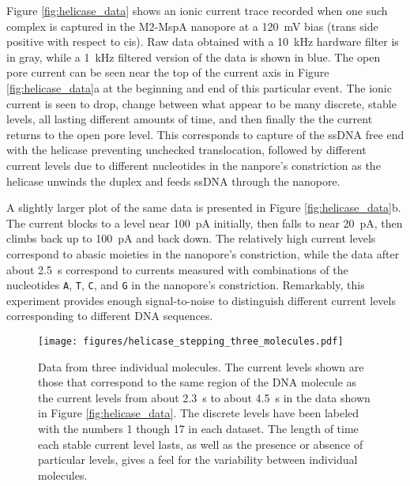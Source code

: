 Figure \ref{fig:helicase_data} shows an ionic current trace recorded when one such complex is captured in the M2-MspA nanopore at a \SI{120}{\mV} bias (trans side positive with respect to cis).  Raw data obtained with a \SI{10}{\kHz} hardware filter is in gray, while a \SI{1}{\kHz} filtered version of the data is shown in blue.  The open pore current can be seen near the top of the current axis in Figure \ref{fig:helicase_data}a at the beginning and end of this particular event.  The ionic current is seen to drop, change between what appear to be many discrete, stable levels, all lasting different amounts of time, and then finally the the current returns to the open pore level.  This corresponds to capture of the ssDNA free end with the helicase preventing unchecked translocation, followed by different current levels due to different nucleotides in the nanpore's constriction as the helicase unwinds the duplex and feeds ssDNA through the nanopore.

A slightly larger plot of the same data is presented in Figure \ref{fig:helicase_data}b.  The current blocks to a level near \SI{100}{\pA} initially, then falls to near \SI{20}{\pA}, then climbs back up to \SI{100}{\pA} and back down.  The relatively high current levels correspond to abasic moieties in the nanopore's constriction, while the data after about \SI{2.5}{\s} correspond to currents measured with combinations of the nucleotides \texttt{A}, \texttt{T}, \texttt{C}, and \texttt{G} in the nanopore's constriction.  Remarkably, this experiment provides enough signal-to-noise to distinguish different current levels corresponding to different DNA sequences.

\begin{figure}[H]
\begin{centering}
\texttt{[image: figures/helicase\_stepping\_three\_molecules.pdf]}
\caption[Helicase stepping along three DNA molecules]{Data from three individual molecules.  The current levels shown are those that correspond to the same region of the DNA molecule as the current levels from about \SI{2.3}{\s} to about \SI{4.5}{\s} in the data shown in Figure \ref{fig:helicase_data}.  The discrete levels have been labeled with the numbers \num{1} though \num{17} in each dataset.  The length of time each stable current level lasts, as well as the presence or absence of particular levels, gives a feel for the variability between individual molecules.}
\label{fig:helicase_data_3}
\end{centering}
\end{figure}

